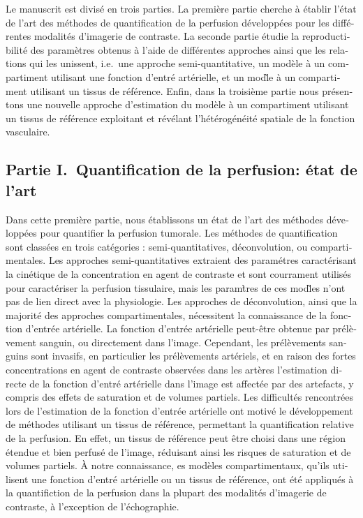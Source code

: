 \begin{otherlanguage}{french}
Le manuscrit est divis\'e en trois parties.
La premi\`ere partie cherche \`a \'etablir l'\'etat de l'art des m\'ethodes de quantification de la perfusion d\'evelopp\'ees pour les diff\'erentes modalit\'es d'imagerie de contraste.
La seconde partie \'etudie la reproductibilit\'e des param\`etres obtenus \`a l'aide de diff\'erentes approches ainsi que les relations qui les unissent, i.e.~une approche semi-quantitative, un mod\`ele \`a un compartiment utilisant une fonction d'entr\'e art\'erielle, et un mod\`le \`a un compartiment utilisant un tissus de r\'ef\'erence.
Enfin, dans la troisi\`eme partie nous pr\'esentons une nouvelle approche d'estimation du mod\`ele \`a un compartiment utilisant un tissus de r\'ef\'erence exploitant et r\'ev\'elant l'h\'et\'erog\'en\'eit\'e spatiale de la fonction vasculaire.

\subsection*{Partie I.~Quantification de la perfusion: \'etat de l'art}
Dans cette premi\`ere partie, nous \'etablissons un \'etat de l'art des m\'ethodes d\'evelopp\'ees pour quantifier la perfusion tumorale. 
Les m\'ethodes de quantification sont class\'ees en trois cat\'egories : semi-quantitatives, d\'econvolution, ou compartimentales.
Les approches semi-quantitatives extraient des param\'etres caract\'erisant la cin\'etique de la concentration en agent de contraste et sont courrament utilis\'es pour caract\'eriser la perfusion tissulaire, mais les param\`tres de ces mod\`les n'ont pas de lien direct avec la physiologie.
Les approches de d\'econvolution, ainsi que la majorit\'e des approches compartimentales, n\'ecessitent la connaissance de la fonction d'entr\'ee art\'erielle.
La fonction d'entr\'ee art\'erielle peut-\^etre obtenue par pr\'el\`evement sanguin, ou directement dans l'image. 
Cependant, les pr\'el\`evements sanguins sont invasifs, en particulier les pr\'el\`evements art\'eriels, et en raison des fortes concentrations en agent de contraste observ\'ees dans les art\`eres l'estimation directe de la fonction d'entr\'e art\'erielle dans l'image est affect\'ee par des artefacts, y compris des effets de saturation et de volumes partiels.
Les difficult\'es rencontr\'ees lors de l'estimation de la fonction d'entr\'ee art\'erielle ont motiv\'e le d\'eveloppement de m\'ethodes utilisant un tissus de r\'ef\'erence, permettant la quantification relative de la perfusion.
En effet, un tissus de r\'ef\'erence peut \^etre choisi dans une r\'egion \'etendue et bien perfus\'e de l'image, r\'eduisant ainsi les risques de saturation et de volumes partiels.
\`A notre connaissance, es mod\`eles compartimentaux, qu'ils utilisent une fonction d'entr\'e art\'erielle ou un tissus de r\'ef\'erence, ont \'et\'e appliqu\'es \`a la quantifiction de la perfusion dans la plupart des modalit\'es d'imagerie de contraste, \`a l'exception de l'\'echographie.


\end{otherlanguage}
